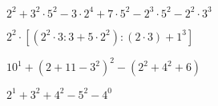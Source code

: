 \begin{esercizio} %
\(2^2+3^2\cdot5^2-3\cdot2^4+7\cdot5^2-2^3\cdot5^2-2^2\cdot3^3\) 
\end{esercizio}
\begin{esercizio} %
\(2^2\cdot[(2^2\cdot3:3+5\cdot2^2):(2\cdot3)+1^3]\) 
\end{esercizio}
\begin{esercizio} %
\(10^1+(2+11-3^2)^2-(2^2+4^2+6)\) 
\end{esercizio}
\begin{esercizio} %
\(2^1+3^2+4^2-5^2-4^0\) 
\end{esercizio}
